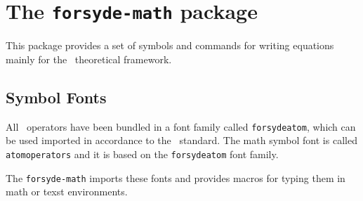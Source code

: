 \vfill
\begin{figure}[htb]\centering
  {%
    \setlength{\fboxsep}{7pt}%
    \setlength{\fboxrule}{1pt}%
  }
\end{figure}

\vfill
\newpage

\section{The \texttt{forsyde-math} package}
\label{sec:forsyde-math-package}

This package provides a set of symbols and commands for writing equations mainly for the \ForSyDeAtom\ theoretical framework.

\subsection{Symbol Fonts}
\label{sec:fonts}

All \ForSyDeAtom\ operators have been bundled in a font family called \texttt{forsydeatom}, which can be used imported in accordance to the \LaTeXe\ standard. The math symbol font is called \texttt{atomoperators} and it is based on the \texttt{forsydeatom} font family.

The \texttt{forsyde-math} imports these fonts and provides macros for typing them in math or texst environments.

